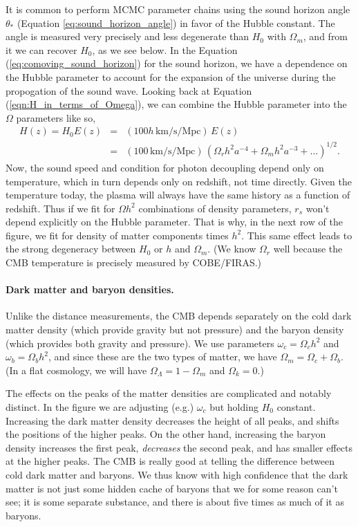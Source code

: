 It is common to perform MCMC parameter chains using the sound horizon angle $\theta_*$ (Equation \ref{eq:sound_horizon_angle}) in favor of the Hubble constant.  The angle is measured very precisely and less degenerate than $H_0$ with $\Omega_m$, and from it we can recover $H_0$, as we see below.  In the Equation (\ref{eq:comoving_sound_horizon}) for the sound horizon, we have a dependence on the Hubble parameter to account for the expansion of the universe during the propogation of the sound wave.  Looking back at Equation (\ref{eqn:H_in_terms_of_Omega}), we can combine the Hubble parameter into the $\Omega$ parameters like so,
\begin{eqnarray}
  H(z) = H_0 E(z) &=& (100 h\, \mbox{km/s/Mpc})\, E(z) \\ \nonumber &=& (100\, \mbox{km/s/Mpc}) \, (\Omega_r h^2 a^{-4} + \Omega_m h^2 a^{-3} + \dots)^{1/2}.
\end{eqnarray}
Now, the sound speed and condition for photon decoupling depend only on temperature, which in turn depends only on redshift, not time directly.  Given the temperature today, the plasma will always have the same history as a function of redshift.  Thus if we fit for $\Omega h^2$ combinations of density parameters, $r_s$ won't depend explicitly on the Hubble parameter.  That is why, in the next row of the figure, we fit for density of matter components times $h^2$. This same effect leads to the strong degeneracy between $H_0$ or $h$ and $\Omega_m$.  (We know $\Omega_r$ well because the CMB temperature is precisely measured by COBE/FIRAS.)

\paragraph{Dark matter and baryon densities.}
Unlike the distance measurements, the CMB depends separately on the cold dark matter density (which provide gravity but not pressure) and the baryon density (which provides both gravity and pressure).  We use parameters $\omega_c = \Omega_c h^2$ and $\omega_b = \Omega_b h^2$, and since these are the two types of matter, we have $\Omega_m = \Omega_c + \Omega_b$.  (In a flat cosmology, we will have $\Omega_\Lambda = 1 - \Omega_m$ and $\Omega_k = 0$.)

The effects on the peaks of the matter densities are complicated and notably distinct.  In the figure we are adjusting (e.g.) $\omega_c$ but holding $H_0$ constant.  Increasing the dark matter density decreases the height of all peaks, and shifts the positions of the higher peaks.  On the other hand, increasing the baryon density increases the first peak, \textit{decreases} the second peak, and has smaller effects at the higher peaks.  The CMB is really good at telling the difference between cold dark matter and baryons.  We thus know with high confidence that the dark matter is not just some hidden cache of baryons that we for some reason can't see; it is some separate substance, and there is about five times as much of it as baryons.

